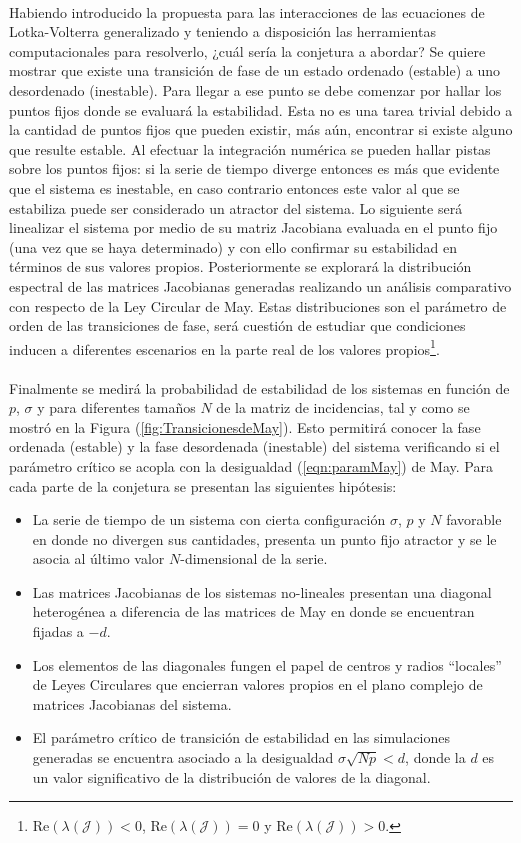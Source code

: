 \\
Habiendo introducido la propuesta para las interacciones de las ecuaciones de Lotka-Volterra generalizado y teniendo a disposición las herramientas computacionales para resolverlo, ¿cuál sería la conjetura a abordar? Se quiere mostrar que existe una transición de fase de un estado ordenado (estable) a uno desordenado (inestable). Para llegar a ese punto se debe comenzar por hallar los puntos fijos donde se evaluará la estabilidad. Esta no es una tarea trivial debido a la cantidad de puntos fijos que pueden existir, más aún, encontrar si existe alguno que resulte estable. Al efectuar la integración numérica se pueden hallar pistas sobre los puntos fijos: si la serie de tiempo diverge entonces es más que evidente que el sistema es inestable, en caso contrario entonces este valor al que se estabiliza puede ser considerado un atractor del sistema.
\newpage
Lo siguiente será linealizar el sistema por medio de su matriz Jacobiana evaluada en el punto fijo (una vez que se haya determinado) y con ello confirmar su estabilidad en términos de sus valores propios. Posteriormente se explorará la distribución espectral de las matrices Jacobianas generadas realizando un análisis comparativo con respecto de la Ley Circular de May. Estas distribuciones son el parámetro de orden de las transiciones de fase, será cuestión de estudiar que condiciones inducen a diferentes escenarios en la parte real de los valores propios\footnote{Re$(\lambda(\mathcal{J}))<0$, Re$(\lambda(\mathcal{J}))=0$ y Re$(\lambda(\mathcal{J}))>0$.}. \\
\\
Finalmente se medirá la probabilidad de estabilidad de los sistemas en función de $p$, $\sigma$ y para diferentes tamaños $N$ de la matriz de incidencias, tal y como se mostró en la Figura (\ref{fig:TransicionesdeMay}). Esto permitirá conocer la fase ordenada (estable) y la fase desordenada (inestable) del sistema verificando si el parámetro crítico se acopla con la desigualdad (\ref{eqn:paramMay}) de May. Para cada parte de la conjetura se presentan las siguientes hipótesis:
\begin{itemize}
	\item[1.] La serie de tiempo de un sistema con cierta configuración $\sigma$, $p$ y $N$ favorable en donde no divergen sus cantidades, presenta un punto fijo atractor y se le asocia al último valor $N$-dimensional de la serie. %
	\item[2.] Las matrices Jacobianas de los sistemas no-lineales presentan una diagonal heterogénea a diferencia de las matrices de May en donde se encuentran fijadas a $-d$.
	\item[3.] Los elementos de las diagonales fungen el papel de centros y radios ``locales'' de Leyes Circulares que encierran valores propios en el plano complejo de matrices Jacobianas del sistema.
	\item[4.] El parámetro crítico de transición de estabilidad en las simulaciones generadas se encuentra asociado a la desigualdad $\sigma\sqrt{Np}<d$, donde la $d$ es un valor significativo de la distribución de valores de la diagonal.
\end{itemize}
